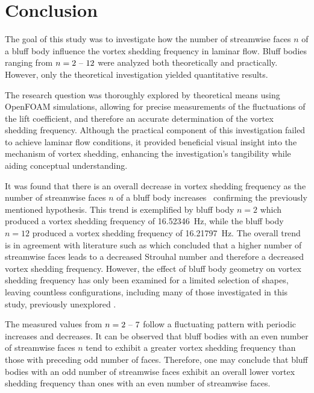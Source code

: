 \section{Conclusion}
\label{sec:conclusion}
The goal of this study was to investigate how the number of streamwise faces $n$ of a bluff body influence the vortex shedding frequency in laminar flow. Bluff bodies ranging from $n = 2 \text{ \textendash\ } 12$ were analyzed both theoretically and practically. However, only the theoretical investigation yielded quantitative results.

The research question was thoroughly explored by theoretical means using OpenFOAM simulations, allowing for precise measurements of the fluctuations of the lift coefficient, and therefore an accurate determination of the vortex shedding frequency. Although the practical component of this investigation failed to achieve laminar flow conditions, it provided beneficial visual insight into the mechanism of vortex shedding, enhancing the investigation's tangibility while aiding conceptual understanding.

It was found that there is an overall decrease in vortex shedding frequency as the number of streamwise faces $n$ of a bluff body increases \textemdash\ confirming the previously mentioned hypothesis. This trend is exemplified by bluff body $n = 2$ which produced a vortex shedding frequency of \SI{16.52346}{\hertz}, while the bluff body $n = 12$ produced a vortex shedding frequency of \SI{16.21797}{\hertz}. The overall trend is in agreement with literature such as \textcite{goncalves1999strouhal} which concluded that a higher number of streamwise faces leads to a decreased Strouhal number and therefore a decreased vortex shedding frequency. However, the effect of bluff body geometry on vortex shedding frequency has only been examined for a limited selection of shapes, leaving countless configurations, including many of those investigated in this study, previously unexplored \parencite[22]{city7565}.

The measured values from $n = 2 \text{ \textendash\ } 7$ follow a fluctuating pattern with periodic increases and decreases. It can be observed that bluff bodies with an even number of streamwise faces $n$ tend to exhibit a greater vortex shedding frequency than those with preceding odd number of faces. Therefore, one may conclude that bluff bodies with an odd number of streamwise faces exhibit an overall lower vortex shedding frequency than ones with an even number of streamwise faces.

